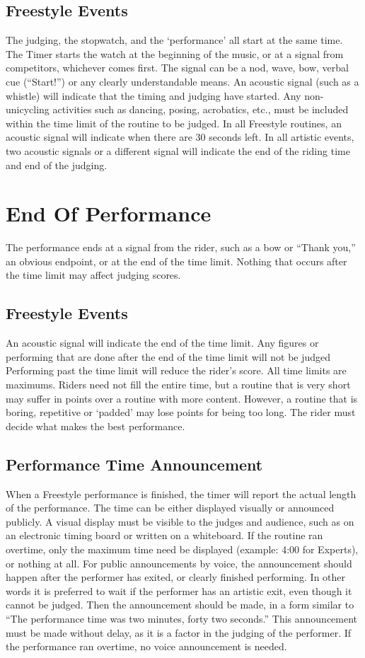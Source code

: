 \subsection{Freestyle Events}
The judging, the stopwatch, and the ‘performance' all start at the same time.
The Timer starts the watch at the beginning of the music, or at a signal from competitors, whichever comes first.
The signal can be a nod, wave, bow, verbal cue (``Start!'') or any clearly understandable means.
An acoustic signal (such as a whistle) will indicate that the timing and judging have started.
Any non-unicycling activities such as dancing, posing, acrobatics, etc., must be included within the time limit of the routine to be judged.
In all Freestyle routines, an acoustic signal will indicate when there are 30 seconds left.
In all artistic events, two acoustic signals or a different signal will indicate the end of the riding time and end of the judging.

\section{End Of Performance}
The performance ends at a signal from the rider, such as a bow or ``Thank you,'' an obvious endpoint, or at the end of the time limit.
Nothing that occurs after the time limit may affect judging scores.

\subsection{Freestyle Events}
An acoustic signal will indicate the end of the time limit.
Any figures or performing that are done after the end of the time limit will not be judged Performing past the time limit will reduce the rider's score.
All time limits are maximums.
Riders need not fill the entire time, but a routine that is very short may suffer in points over a routine with more content.
However, a routine that is boring, repetitive or ‘padded' may lose points for being too long.
The rider must decide what makes the best performance.

\subsection{Performance Time Announcement}
When a Freestyle performance is finished, the timer will report the actual length of the performance.
The time can be either displayed visually or announced publicly.
A visual display must be visible to the judges and audience, such as on an electronic timing board or written on a whiteboard.
If the routine ran overtime, only the maximum time need be displayed (example: 4:00 for Experts), or nothing at all.
For public announcements by voice, the announcement should happen after the performer has exited, or clearly finished performing.
In other words it is preferred to wait if the performer has an artistic exit, even though it cannot be judged.
Then the announcement should be made, in a form similar to ``The performance time was two minutes, forty two seconds.'' This announcement must be made without delay, as it is a factor in the judging of the performer.
If the performance ran overtime, no voice announcement is needed.

